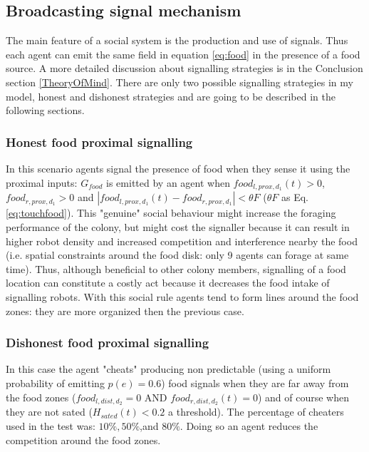 \subsection{Broadcasting signal mechanism}
\label{SocialSystem:Broadcast}
The main feature of a social system is the production and use of signals.
Thus each agent can emit the same field in equation \ref{eq:food} in the presence of a food source.
A more detailed discussion about signalling strategies is in the Conclusion section \ref{TheoryOfMind}.
There are only two possible signalling strategies in my model, honest and dishonest
strategies and are going to be described in the following sections.

\subsubsection{Honest food proximal signalling}
In this scenario agents signal the presence of food when they sense it using
the proximal inputs: $G_{food}$ is emitted by an agent when $food_{l,prox,d_{1}}(t)>0$, $food_{r,prox,d_{1}}>0$
and $|food_{l,prox,d_{1}}(t)-food_{r,prox,d_{1}}|<\theta F$ ($\theta F$ as Eq.\ref{eq:touchfood}).
This "genuine" social behaviour might increase the foraging performance of the colony,
but might cost the signaller because it can result in higher robot density and increased
competition and interference nearby the food (i.e. spatial constraints around the food disk:
only 9 agents can forage at same time). Thus, although beneficial to other colony members,
signalling of a food location can constitute a costly act \citep{AnimalSignals} because it
decreases the food intake of signalling robots. With this social rule agents tend to form
lines around the food zones: they are more organized then the previous case.

\subsubsection{Dishonest food proximal signalling}
In this case the agent "cheats" producing non predictable (using a uniform probability
of emitting $p(e)=0.6$) food signals when they are far away from the food zones
($food_{l,dist,d_{2}}=0$ AND $food_{r,dist,d_{2}}(t)=0$) and of course when they
are not sated ($H_{sated}(t)< 0.2$ a threshold). The percentage of cheaters used in the
test was: $10\%,50\%$,and $80\%$. Doing so an agent reduces the competition around the food zones.


